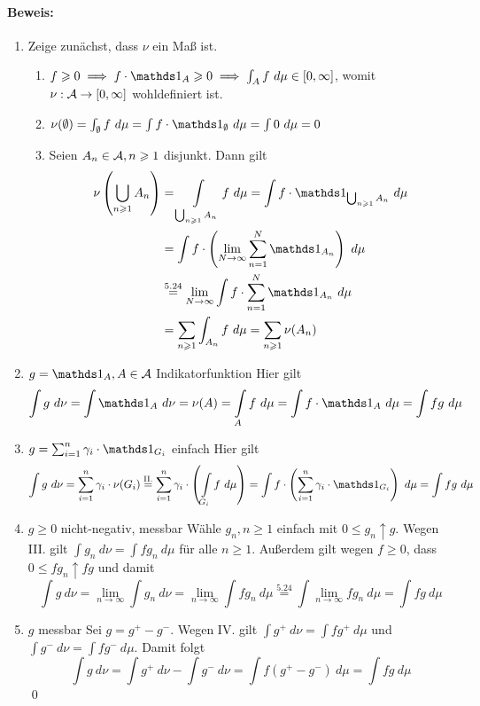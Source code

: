  \paragraph{Beweis:}
 \begin{enumerate}[label=\Roman*.]
     \item Zeige zun\"achst, dass $\nu$ ein Ma\ss{} ist.\newline
     \begin{enumerate}[label=(\roman*)]
        \item $ f\geq0\implies f\cdot\ind{A}\geq0\implies\int_A f\ d\mu\in[0,\infty]$, womit $\nu:\mathcal{A}\to[0,\infty]$ wohldefiniert ist.
        \item $\nu(\emptyset)=\int_\emptyset f\ d\mu=\int f\cdot\ind{\emptyset}\ d\mu=\int 0 \ d\mu=0$
        \item Seien $A_n\in\mathcal{A},n\geqslant1$ disjunkt. Dann gilt
        \begin{align*}
            \nu\left(\bigcup_{n\geq1}A_n\right)&=\int\displaylimits_{\bigcup_{n\geq1}A_n}f\ d\mu=\int f\cdot\ind{\bigcup_{n\geq1}A_n}\ d\mu\\
            &=\int f\cdot\left(\lim_{N\to\infty}\sum_{n=1}^N\ind{A_n}\right)\ d\mu\\
            &\overset{5.24}{=}\lim_{N\to\infty}\int f\cdot\sum_{n=1}^N\ind{A_n}\ d\mu\\
            &=\sum_{n\geq1}\int_{A_n} f\ d\mu=\sum_{n\geq1}\nu(A_n)
        \end{align*}
     \end{enumerate}
     \item $g=\ind{A},A\in\A$ Indikatorfunktion\newline
     Hier gilt
     $$\int g\ d\nu=\int \ind{A}\ d\nu=\nu(A)=\int\displaylimits_{A} f\ d\mu=\int f\cdot\ind{A}\ d\mu=\int fg\ d\mu$$
     \item $g=\sum_{i=1}^n\gamma_i\cdot\ind{G_i}$ einfach\newline
     Hier gilt
     \begin{align*}
         \int g\ d\nu=\sum_{i=1}^n\gamma_i\cdot\nu(G_i)\overset{\text{II.}}{=}\sum_{i=1}^n\gamma_i\cdot\left(\int\displaylimits_{G_i}f\ d\mu\right)=\int f\cdot\left(\sum_{i=1}^n\gamma_i\cdot\ind{G_i}\right)\ d\mu=\int fg\ d\mu
     \end{align*}
     \item $g\geq0$ nicht-negativ, messbar\newline
     W\"ahle $g_n,n\geq1$ einfach mit $0\leq g_n\uparrow g$. Wegen III. gilt $\displaystyle\int g_n\ d\nu=\int fg_n\ d\mu$ f\"ur alle $n\geq1$. Au\ss{}erdem gilt wegen $f\geq0$, dass $0\leq fg_n\uparrow fg$ und damit
     $$\int g \ d\nu=\lim_{n\to\infty}\int g_n\ d\nu=\lim_{n\to\infty}\int fg_n\ d\mu\overset{5.24}{=}\int \lim_{n\to\infty}fg_n\ d\mu=\int fg\ d\mu$$
     \item $g$ messbar\newline
     Sei $g=g^+-g^-$. Wegen IV. gilt $\displaystyle\int g^+\ d\nu=\int fg^+\ d\mu$ und $\displaystyle\int g^-\ d\nu=\int fg^-\ d\mu$. Damit folgt
     $$\int g\ d\nu=\int g^+\ d\nu-\int g^-\ d\nu=\int f(g^+-g^-)\ d\mu=\int fg\ d\mu$$
     \qed
 \end{enumerate}
 
